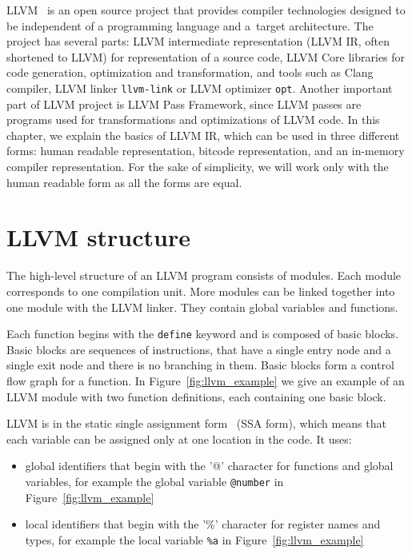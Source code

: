 LLVM~\cite{llvm} is an open source project that provides compiler technologies
designed to be independent of a programming language and a~target architecture.
The project has several parts: LLVM intermediate representation (LLVM IR, often
shortened to LLVM) for representation of a source code, LLVM Core libraries for
code generation, optimization and transformation, and tools such as Clang
compiler, LLVM linker \texttt{llvm-link} or LLVM optimizer \texttt{opt}.
Another important part of LLVM project is LLVM Pass Framework, since LLVM
passes are programs used for transformations and optimizations of LLVM code. In
this chapter, we explain the basics of LLVM IR, which can be used in three
different forms: human readable representation, bitcode representation, and an
in-memory compiler representation. For the sake of simplicity, we will work
only with the human readable form as all the forms are equal.


\section{LLVM structure}

The high-level structure of an LLVM program consists of modules. Each module
corresponds to one compilation unit. More modules can be linked together into
one module with the LLVM linker. They contain global variables and functions.

Each function begins with the \texttt{define} keyword and is composed of basic
blocks. Basic blocks are sequences of instructions, that have a single entry node
and a single exit node and there is no branching in them. Basic blocks form
a control flow graph for a function. In Figure~\ref{fig:llvm_example} we give
an example of an LLVM module with two function definitions, each containing one
basic block.

LLVM is in the static single assignment form~\cite{ssa} (SSA form), which means that each
variable can be assigned only at one location in the code. It uses:

\begin{itemize}
    \item global identifiers that begin with the '@' character for functions
    and global variables, for example the global variable \texttt{@number} in
    Figure~\ref{fig:llvm_example}
    \item local identifiers that begin with the '\%' character for register
    names and types, for example the local variable \texttt{\%a} in
    Figure~\ref{fig:llvm_example}
\end{itemize}

